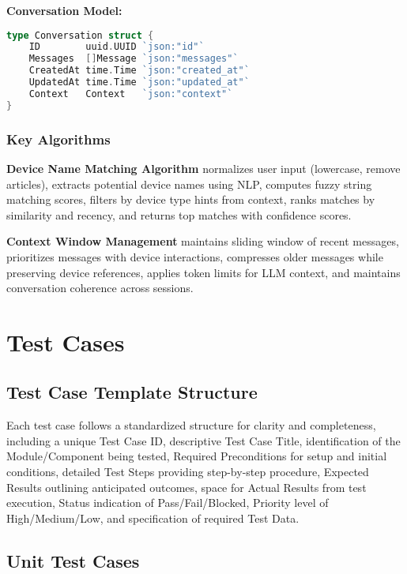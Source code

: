 \documentclass[12pt]{article}
\begin{document}
\textbf{Conversation Model:}
\begin{lstlisting}[language=Go, caption=Conversation Data Structure]
type Conversation struct {
    ID        uuid.UUID `json:"id"`
    Messages  []Message `json:"messages"`
    CreatedAt time.Time `json:"created_at"`
    UpdatedAt time.Time `json:"updated_at"`
    Context   Context   `json:"context"`
}
\end{lstlisting}

\subsubsection{Key Algorithms}

\textbf{Device Name Matching Algorithm} normalizes user input (lowercase, remove articles), extracts potential device names using NLP, computes fuzzy string matching scores, filters by device type hints from context, ranks matches by similarity and recency, and returns top matches with confidence scores.

\textbf{Context Window Management} maintains sliding window of recent messages, prioritizes messages with device interactions, compresses older messages while preserving device references, applies token limits for LLM context, and maintains conversation coherence across sessions.

\section{Test Cases}

\subsection{Test Case Template Structure}

Each test case follows a standardized structure for clarity and completeness, including a unique Test Case ID, descriptive Test Case Title, identification of the Module/Component being tested, Required Preconditions for setup and initial conditions, detailed Test Steps providing step-by-step procedure, Expected Results outlining anticipated outcomes, space for Actual Results from test execution, Status indication of Pass/Fail/Blocked, Priority level of High/Medium/Low, and specification of required Test Data.

\subsection{Unit Test Cases}
\end{document}
